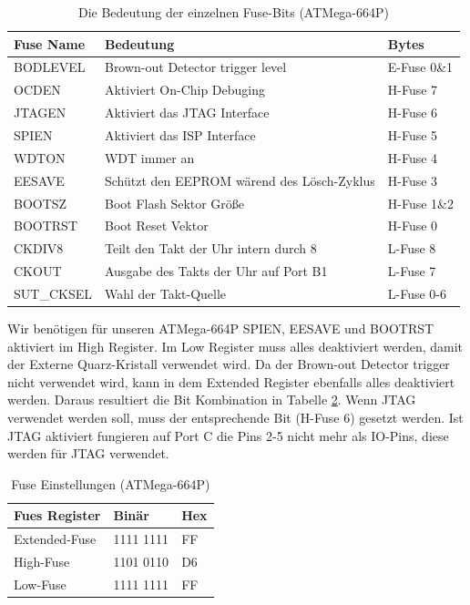 \begin{table} [H]
\begin{tabular}{|l|l|l|} \hline
Fuse Name & Bedeutung & Bytes\\ \hline
BODLEVEL & Brown-out Detector trigger level & E-Fuse 0\&1\\ \hline
OCDEN & Aktiviert On-Chip Debuging & H-Fuse 7\\ \hline
JTAGEN & Aktiviert das \ac{JTAG} Interface & H-Fuse 6\\ \hline
SPIEN & Aktiviert das \ac{ISP} Interface & H-Fuse 5\\ \hline
WDTON & \ac{WDT} immer an & H-Fuse 4\\ \hline
EESAVE & Schützt den \acs{EEPROM} wärend des Lösch-Zyklus & H-Fuse 3\\ \hline
BOOTSZ & Boot Flash Sektor Größe & H-Fuse 1\&2\\ \hline
BOOTRST & Boot Reset Vektor & H-Fuse 0\\ \hline
CKDIV8 & Teilt den Takt der Uhr intern durch 8 & L-Fuse 8\\ \hline
CKOUT & Ausgabe des Takts der Uhr auf Port B1 & L-Fuse 7\\ \hline
SUT\_CKSEL & Wahl der Takt-Quelle & L-Fuse 0-6\\ \hline
\end{tabular}
\caption{Die Bedeutung der einzelnen Fuse-Bits (ATMega-664P)}
\label{fuses-names}
\end{table}

Wir benötigen für unseren ATMega-664P SPIEN, EESAVE und BOOTRST aktiviert im
High Register. Im Low Register muss alles deaktiviert werden, damit der Externe
Quarz-Kristall verwendet wird. Da der Brown-out Detector trigger nicht
verwendet wird, kann in dem Extended Register ebenfalls alles deaktiviert
werden. Daraus resultiert die Bit Kombination in Tabelle \ref{fuses-result}.
Wenn \ac{JTAG} verwendet werden soll, muss der entsprechende Bit (H-Fuse 6)
gesetzt werden. Ist \ac{JTAG} aktiviert fungieren auf Port C die Pins 2-5
nicht mehr als IO-Pins, diese werden für \ac{JTAG} verwendet.

\begin{table}[H]
\centering
\begin{tabular}{|l|l|l|} \hline
Fues Register & Binär & Hex\\ \hline
Extended-Fuse & 1111 1111 & FF\\ \hline
High-Fuse & 1101 0110 & D6\\ \hline
Low-Fuse & 1111 1111 & FF\\ \hline
\end{tabular}
\caption{Fuse Einstellungen (ATMega-664P)}
\label{fuses-result}
\end{table}


